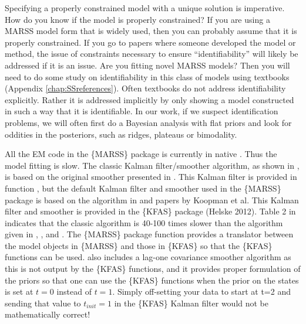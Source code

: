 Specifying a properly constrained model with a unique solution is imperative.  How do you know if the model is properly constrained?  If you are using a MARSS model form that is widely used, then you can probably assume that it is properly constrained. If you go to papers where someone developed the model or method, the issue of constraints necessary to ensure ``identifiability'' will likely be addressed if it is an issue.  Are you fitting novel MARSS models? Then you will need to do some study on identifiability in this class of models using textbooks (Appendix \ref{chap:SSreferences}).  Often textbooks do not address identifiability explicitly.  Rather it is addressed implicitly by only showing a model constructed in such a way that it is identifiable.  In our work, if we suspect identification problems, we will often first do a Bayesian analysis with flat priors and look for oddities in the posteriors, such as ridges, plateaus or bimodality.
 
All the EM code in the \{MARSS\} package is currently in native \R.  Thus the model fitting is slow.  The classic Kalman filter/smoother algorithm, as shown in \citet[p. 331-335]{ShumwayStoffer2006}, is based on the original smoother presented in \citet{Rauch1963}. This Kalman filter is provided in function \verb@MARSSkfss@, but the default Kalman filter and smoother used in the \{MARSS\} package is based on the algorithm in \citet{KohnAnsley1989} and papers by Koopman et al. This Kalman filter and smoother is provided in the \{KFAS\} package (Helske 2012).  Table 2 in \citet{Koopman1993} indicates that the classic algorithm is 40-100 times slower than the algorithm given in \citet{KohnAnsley1989}, \citet{Koopman1993}, and \citet{Koopmanetal1998}. The \{MARSS\} package function \verb@MARSSkfas@ provides a translator between the model objects in \{MARSS\} and those in \{KFAS\} so that the \{KFAS\} functions can be used.  \verb@MARSSkfas@ also includes a lag-one covariance smoother algorithm as this is not output by the \{KFAS\} functions, and it provides proper formulation of the priors so that one can use the \{KFAS\} functions when the prior on the states is set at $t=0$ instead of $t=1$. Simply off-setting your data to start at t=2 and sending that value to $t_{init}=1$ in the \{KFAS\} Kalman filter would not be mathematically correct!


